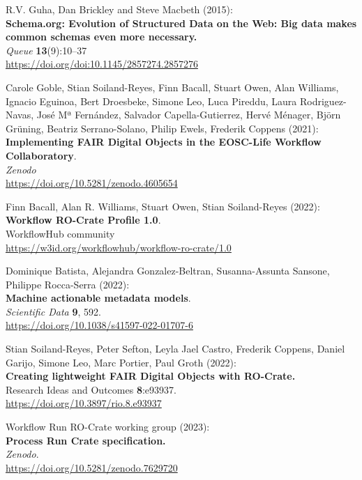 \documentclass[10pt,letterpaper]{article}
\begin{document}
\begin{thebibliography}{10}
\begin{small}
R.V. Guha, Dan Brickley and Steve Macbeth (2015):\\
\textbf{Schema.org: Evolution of Structured Data on the Web: Big data makes common schemas even more necessary.}\\
\emph{Queue} \textbf{13}(9):10--37\\
\url{https://doi.org/doi:10.1145/2857274.2857276}



Carole Goble, Stian Soiland-Reyes, Finn Bacall, Stuart Owen, Alan Williams, Ignacio Eguinoa, Bert Droesbeke, Simone Leo, Luca Pireddu, Laura Rodriguez-Navas, José Mª Fernández, Salvador Capella-Gutierrez, Hervé Ménager, Björn Grüning, Beatriz Serrano-Solano, Philip Ewels, Frederik Coppens (2021):\\
\textbf{Implementing FAIR Digital Objects in the EOSC-Life Workflow Collaboratory}.\\
\emph{Zenodo}\\
\url{https://doi.org/10.5281/zenodo.4605654}

Finn Bacall, Alan R. Williams, Stuart Owen, Stian Soiland-Reyes (2022):\\
\textbf{Workflow RO-Crate Profile 1.0}.\\
WorkflowHub community\\
\url{https://w3id.org/workflowhub/workflow-ro-crate/1.0}

Dominique Batista, Alejandra Gonzalez-Beltran, Susanna-Assunta Sansone, Philippe Rocca-Serra (2022):\\
\textbf{Machine actionable metadata models}.\\
\emph{Scientific Data} \textbf{9}, 592.\\
\url{https://doi.org/10.1038/s41597-022-01707-6}

 Stian Soiland-Reyes, Peter Sefton, Leyla Jael
Castro, Frederik Coppens, Daniel Garijo, Simone Leo, Marc Portier, Paul
Groth (2022):\\
\textbf{Creating lightweight FAIR Digital Objects with RO-Crate.}\\
Research Ideas and Outcomes \textbf{8}:e93937.\\
\url{https://doi.org/10.3897/rio.8.e93937}




 Workflow Run RO-Crate working group (2023):\\
\textbf{Process Run Crate specification.}\\
\emph{Zenodo}.\\
\url{https://doi.org/10.5281/zenodo.7629720}


\end{small}
\end{thebibliography}
\end{document}
